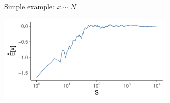 \documentclass[english,t]{beamer}
\begin{document}
\begin{frame}{Simple example: $x \sim N$}

    \vspace{-1\baselineskip}
    \includegraphics[width=8.5cm]{Ex1b.pdf}\\
\end{frame}
\end{document}
